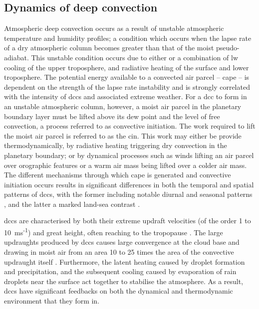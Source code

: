 \subsection{Dynamics of deep convection}

Atmospheric deep convection occurs as a result of unstable atmospheric temperature and humidity profiles; a condition which occurs when the lapse rate of a dry atmospheric column becomes greater than that of the moist pseudo-adiabat.
This unstable condition occurs due to either or a combination of \acrshort{lw}  cooling of the upper troposphere, and radiative heating of the surface and lower troposphere.
The potential energy available to a convected air parcel -- \acrshort{cape} -- is dependent on the strength of the lapse rate instability and is strongly correlated with the intensity of \acrshort{dcc}s and associated extreme weather.
For a \acrshort{dcc} to form in an unstable atmospheric column, however, a moist air parcel in the planetary boundary layer must be lifted above its dew point and the level of free convection, a process referred to as convective initiation.
The work required to lift the moist air parcel is referred to as the \acrshort{cin}.
This work may either be provide thermodynamically, by radiative heating triggering dry convection in the planetary boundary; or by dynamical processes such as winds lifting an air parcel over orographic features or a warm air mass being lifted over a colder air mass.
The different mechanisms through which \acrshort{cape} is generated and convective initiation occurs results in significant differences in both the temporal and spatial patterns of \acrshort{dcc}s, with the former including notable diurnal and seasonal patterns \citep{chen_diurnal_1997}, and the latter a marked land-sea contrast \citep{taylor_evaluating_2017}.

\acrshort{dcc}s are characterised by both their extreme updraft velocities (of the order 1 to 10~ms\textsuperscript{-1}) and great height, often reaching to the tropopause \citep{weisman_mesoscale_2015}.
The large updraughts produced by \acrshort{dcc}s causes large convergence at the cloud base and drawing in moist air from an area 10 to 25 times the area of the convective updraught itself \citep{trenberth_changing_2003}.
Furthermore, the latent heating caused by droplet formation and precipitation, and the subsequent cooling caused by evaporation of rain droplets near the surface act together to stabilise the atmosphere.
As a result, \acrshort{dcc}s have significant feedbacks on both the dynamical and thermodynamic environment that they form in.



